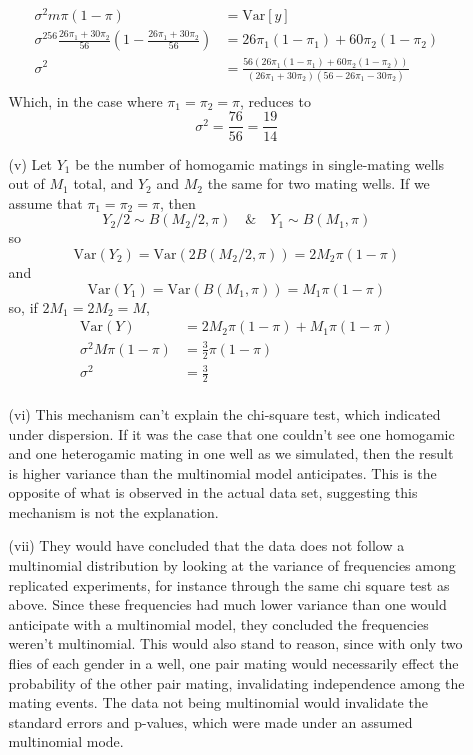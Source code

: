 \documentclass[11pt]{article}
\newcommand{\var}{\mathrm{Var}}
\theoremstyle{definition}
\begin{document}
\begin{itemize}
\begin{itemize}
\begin{align*}
                    \sigma^2m\pi(1-\pi) &= \var[y] \\
                    \sigma^256\frac{26\pi_1 + 30\pi_2}{56}\left(1-\frac{26\pi_1 + 30\pi_2}{56}\right) &= 26\pi_1(1-\pi_1) + 60\pi_2(1-\pi_2)\\
                    \sigma^2&= \frac{56(26\pi_1(1-\pi_1) + 60\pi_2(1-\pi_2))}{(26\pi_1 + 30\pi_2)(56-26\pi_1 - 30\pi_2)}\\
                \end{align*}
                Which, in the case where $\pi_1=\pi_2=\pi$, reduces to 
                \[ \sigma^2 = \frac{76}{56} = \frac{19}{14}\]
            \item[(v)]
                Let $Y_1$ be the number of homogamic matings in single-mating wells out of $M_1$ total,  and $Y_2$ and $M_2$ the same for two mating wells. If we assume that $\pi_1=\pi_2=\pi$, then 
                \[ Y_2/2 \sim B(M_2/2,\pi) \quad \&\quad Y_1 \sim B(M_1,\pi)\]
                so 
                \[\var(Y_2) = \var(2B(M_2/2,\pi)) = 2M_2\pi(1-\pi)\]
                and 
                \[\var(Y_1) = \var(B(M_1,\pi)) = M_1\pi(1-\pi)\]
                so, if $2M_1=2M_2=M$,
                \begin{align*}
                    \var(Y) &= 2M_2\pi(1-\pi)+M_1\pi(1-\pi) \\
                    \sigma^2M\pi(1-\pi) &= \frac{3}{2}\pi(1-\pi) \\
                    \sigma^2 &= \frac{3}{2} \\
                \end{align*}
            \item[(vi)]
                This mechanism can't explain the chi-square test, which indicated under dispersion. If it was the case that one couldn't see one homogamic and one heterogamic mating in one well as we simulated, then the result is higher variance than the multinomial model anticipates. This is the opposite of what is observed in the actual data set, suggesting this mechanism is not the explanation.  
            \item[(vii)]
                They would have concluded that the data does not follow a multinomial distribution by looking at the variance of frequencies among replicated experiments, for instance through the same chi square test as above. Since these frequencies had much lower variance than one would anticipate with a multinomial model, they concluded the frequencies weren't multinomial. This would also stand to reason, since with only two flies of each gender in a well, one pair mating would necessarily effect the probability of the other pair mating, invalidating independence among the mating events. The data not being multinomial would invalidate the standard errors and p-values, which were made under an assumed multinomial mode.

\end{itemize}
\end{itemize}
\end{document}
